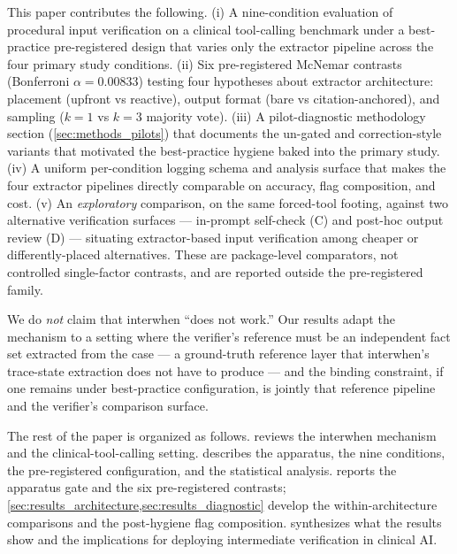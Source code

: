 This paper contributes the following. (i) A nine-condition evaluation
of procedural input verification on a clinical tool-calling benchmark
under a best-practice pre-registered design that varies only the
extractor pipeline across the four primary study conditions.
(ii) Six pre-registered McNemar contrasts (Bonferroni
$\alpha = 0.00833$) testing four hypotheses about extractor
architecture: placement (upfront vs reactive), output format (bare vs
citation-anchored), and sampling ($k=1$ vs $k=3$ majority vote).
(iii) A pilot-diagnostic methodology section
(\cref{sec:methods_pilots}) that documents the un-gated and
correction-style variants that motivated the best-practice hygiene
baked into the primary study.
(iv) A uniform per-condition logging schema and analysis surface that
makes the four extractor pipelines directly comparable on accuracy,
flag composition, and cost.
(v) An \emph{exploratory} comparison, on the same forced-tool footing,
against two alternative verification surfaces --- in-prompt self-check
(C) and post-hoc output review (D) --- situating extractor-based input
verification among cheaper or differently-placed alternatives. These
are package-level comparators, not controlled single-factor contrasts,
and are reported outside the pre-registered family.

We do \emph{not} claim that interwhen ``does not work.'' Our results
adapt the mechanism to a setting where the verifier's reference must be
an independent fact set extracted from the case --- a ground-truth
reference layer that interwhen's trace-state extraction does not have to
produce --- and the binding constraint, if one remains under
best-practice configuration, is jointly that reference pipeline and the
verifier's comparison surface.

The rest of the paper is organized as follows. 
reviews the interwhen mechanism and the clinical-tool-calling setting.
 describes the apparatus, the nine
conditions, the pre-registered configuration, and the statistical
analysis.  reports the apparatus gate and the
six pre-registered contrasts;
\cref{sec:results_architecture,sec:results_diagnostic} develop the
within-architecture comparisons and the post-hygiene flag
composition.  synthesizes what the results
show and the implications for deploying intermediate verification in
clinical AI.
